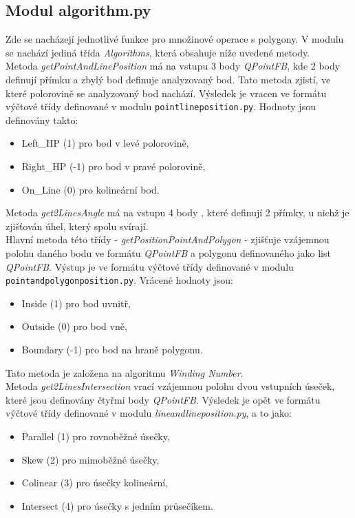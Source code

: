 \documentclass{article}
\begin{document}
\subsection{\small{Modul algorithm.py}}
Zde se nacházejí jednotlivé funkce pro množinové operace s polygony. V modulu se nachází jediná třída \emph{Algorithms}, která obsahuje níže uvedené metody.\\
Metoda \emph{getPointAndLinePosition} má na vstupu 3 body \emph{QPointFB}, kde 2 body definují přímku a zbylý bod definuje analyzovaný bod. Tato metoda zjistí, ve které polorovině se analyzovaný bod nachází. Výsledek je vracen ve formátu výčtové třídy definované v modulu \texttt{pointlineposition.py}. Hodnoty jsou definovány takto:\begin{itemize}
    \item Left\_HP (1) pro bod v levé polorovině,
    \item Right\_HP (-1) pro bod v pravé polorovině,
    \item On\_Line (0) pro kolineární bod.
\end{itemize}
Metoda \emph{get2LinesAngle} má na vstupu 4 body , které definují 2 přímky, u nichž je zjišťován úhel, který spolu svírají.\\
Hlavní metoda této třídy - \emph{getPositionPointAndPolygon} - zjišťuje vzájemnou polohu daného bodu ve formátu \emph{QPointFB} a polygonu definovaného jako list \emph{QPointFB}. Výstup je ve formátu výčtové třídy definované v modulu \texttt{pointandpolygonposition.py}. Vrácené hodnoty jsou: \begin{itemize}
    \item Inside (1) pro bod uvnitř,
    \item Outside (0) pro bod vně,
    \item Boundary (-1) pro bod na hraně polygonu.
\end{itemize}
Tato metoda je založena na algoritmu \emph{Winding Number}.\\
Metoda \emph{get2LinesIntersection} vrací vzájemnou polohu dvou vstupních úseček, které jsou definovány čtyřmi body \emph{QPointFB}. Výsledek je opět ve formátu výčtové třídy definované v modulu \emph{lineandlineposition.py}, a to jako: \begin{itemize}
    \item Parallel (1) pro rovnoběžné úsečky,
    \item Skew (2) pro mimoběžné úsečky,
    \item Colinear (3) pro úsečky kolineární,
    \item Intersect (4) pro úsečky s jedním průsečíkem.
\end{itemize}
\end{document}
